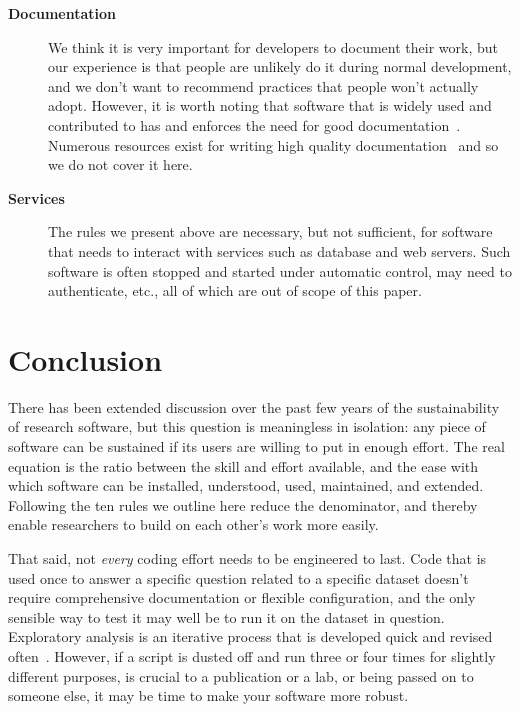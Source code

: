 \documentclass[10pt,letterpaper]{article}
\begin{document}
\begin{description}

\item[\textbf{Documentation}] We think it is very important for
  developers to document their work, but our experience is that people
  are unlikely do it during normal development, and we don't want to
  recommend practices that people won't actually adopt. However, it is worth
  noting that software that is widely used and contributed to has and enforces
  the need for good documentation~\cite{gentleman2004}.
  Numerous resources exist for writing high quality
  documentation~\cite{karimzadeh2016} and so we do not cover it here.

\item[\textbf{Services}] The rules we present above are necessary, but
  not sufficient, for software that needs to interact with services
  such as database and web servers.  Such software is often stopped
  and started under automatic control, may need to authenticate, etc.,
  all of which are out of scope of this paper.

\end{description}

\section*{Conclusion}

There has been extended discussion over the past few years of the
sustainability of research software, but this question is meaningless
in isolation: any piece of software can be sustained if its users are
willing to put in enough effort.  The real equation is the ratio
between the skill and effort available, and the ease with which
software can be installed, understood, used, maintained, and extended.
Following the ten rules we outline here reduce the denominator, and
thereby enable researchers to build on each other's work more easily.

That said, not \emph{every} coding effort needs to be engineered to
last.  Code that is used once to answer a specific question related to
a specific dataset doesn't require comprehensive documentation or
flexible configuration, and the only sensible way to test it may well
be to run it on the dataset in question. Exploratory analysis is an
iterative process that is developed quick and revised
often~\cite{lawlor2015,sanders2008}.  However, if a script is dusted
off and run three or four times for slightly different purposes, is
crucial to a publication or a lab, or being passed on to someone else,
it may be time to make your software more robust.


\end{document}
